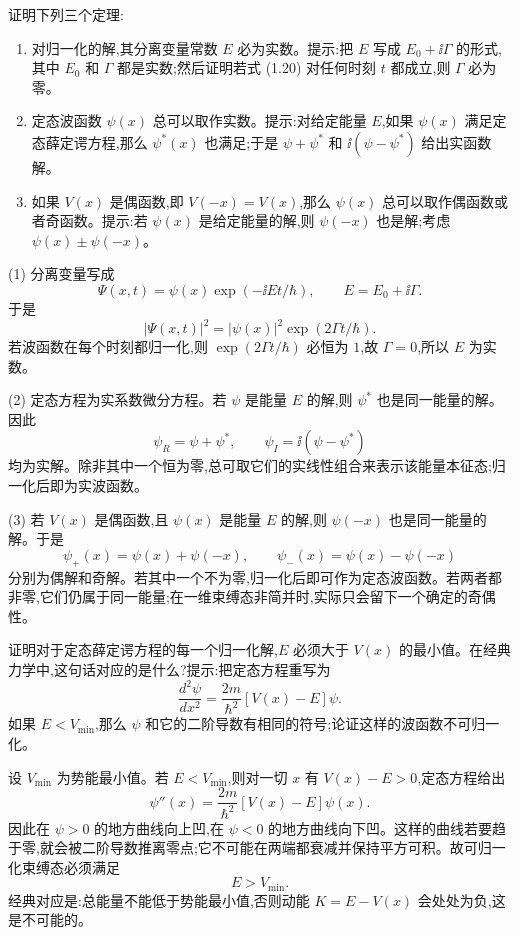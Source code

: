 \begin{question}
证明下列三个定理:
\begin{enumerate}
\item 对归一化的解,其分离变量常数 $E$ 必为实数。提示:把 $E$ 写成 $E_0+\ii\Gamma$ 的形式,其中 $E_0$ 和 $\Gamma$ 都是实数;然后证明若式 (1.20) 对任何时刻 $t$ 都成立,则 $\Gamma$ 必为零。
\item 定态波函数 $\psi(x)$ 总可以取作实数。提示:对给定能量 $E$,如果 $\psi(x)$ 满足定态薛定谔方程,那么 $\psi^*(x)$ 也满足;于是 $\psi+\psi^*$ 和 $\ii(\psi-\psi^*)$ 给出实函数解。
\item 如果 $V(x)$ 是偶函数,即 $V(-x)=V(x)$,那么 $\psi(x)$ 总可以取作偶函数或者奇函数。提示:若 $\psi(x)$ 是给定能量的解,则 $\psi(-x)$ 也是解;考虑 $\psi(x)\pm\psi(-x)$。
\end{enumerate}

\par\smallskip
{}

\end{question}
\begin{solution}
(1) 分离变量写成
\[
\Psi(x,t)=\psi(x)\exp(-\ii Et/\hbar),\qquad E=E_0+\ii\Gamma .
\]
于是
\[
|\Psi(x,t)|^2=|\psi(x)|^2\exp(2\Gamma t/\hbar).
\]
若波函数在每个时刻都归一化,则 $\exp(2\Gamma t/\hbar)$ 必恒为 $1$,故 $\Gamma=0$,所以 $E$ 为实数。

(2) 定态方程为实系数微分方程。若 $\psi$ 是能量 $E$ 的解,则 $\psi^*$ 也是同一能量的解。因此
\[
\psi_R=\psi+\psi^*,\qquad \psi_I=\ii(\psi-\psi^*)
\]
均为实解。除非其中一个恒为零,总可取它们的实线性组合来表示该能量本征态;归一化后即为实波函数。

(3) 若 $V(x)$ 是偶函数,且 $\psi(x)$ 是能量 $E$ 的解,则 $\psi(-x)$ 也是同一能量的解。于是
\[
\psi_+(x)=\psi(x)+\psi(-x),\qquad \psi_-(x)=\psi(x)-\psi(-x)
\]
分别为偶解和奇解。若其中一个不为零,归一化后即可作为定态波函数。若两者都非零,它们仍属于同一能量;在一维束缚态非简并时,实际只会留下一个确定的奇偶性。
\end{solution}

\begin{question}
证明对于定态薛定谔方程的每一个归一化解,$E$ 必须大于 $V(x)$ 的最小值。在经典力学中,这句话对应的是什么?提示:把定态方程重写为
\[
\frac{d^2\psi}{dx^2}=\frac{2m}{\hbar^2}[V(x)-E]\psi .
\]
如果 $E<V_{\min}$,那么 $\psi$ 和它的二阶导数有相同的符号;论证这样的波函数不可归一化。
\end{question}
\begin{solution}
设 $V_{\min}$ 为势能最小值。若 $E<V_{\min}$,则对一切 $x$ 有 $V(x)-E>0$,定态方程给出
\[
\psi''(x)=\frac{2m}{\hbar^2}[V(x)-E]\psi(x).
\]
因此在 $\psi>0$ 的地方曲线向上凹,在 $\psi<0$ 的地方曲线向下凹。这样的曲线若要趋于零,就会被二阶导数推离零点;它不可能在两端都衰减并保持平方可积。故可归一化束缚态必须满足
\[
E>V_{\min}.
\]
经典对应是:总能量不能低于势能最小值,否则动能 $K=E-V(x)$ 会处处为负,这是不可能的。
\end{solution}

